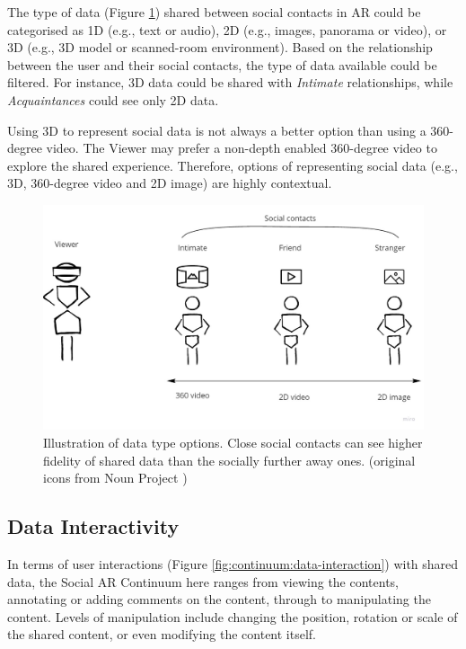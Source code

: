 The type of data (Figure \ref{fig:continuum:data-type}) shared between social contacts in AR could be categorised as 1D (e.g., text or audio), 2D (e.g., images, panorama or video), or 3D (e.g., 3D model or scanned-room environment). Based on the relationship between the user and their social contacts, the type of data available could be filtered. For instance, 3D data could be shared with \textit{Intimate} relationships, while \textit{Acquaintances} could see only 2D data.  

Using 3D to represent social data is not always a better option than using a 360-degree video. The Viewer may prefer a non-depth enabled 360-degree video to explore the shared experience. Therefore, options of representing social data (e.g., 3D, 360-degree video and 2D image) are highly contextual.

\begin{figure}[ht]
    \centering
    \includegraphics[width=0.8\linewidth]{images/30-continuum/Continuum-Data-type.jpg}
    \caption{Illustration of data type options. Close social contacts can see higher fidelity of shared data than the socially further away ones. (original icons from Noun Project \cite{TheNounProjectInc.})}
    \label{fig:continuum:data-type}
\end{figure}

\subsection{Data Interactivity}

In terms of user interactions (Figure \ref{fig:continuum:data-interaction}) with shared data, the Social AR Continuum here ranges from viewing the contents, annotating or adding comments on the content, through to manipulating the content. Levels of manipulation include changing the position, rotation or scale of the shared content, or even modifying the content itself.

